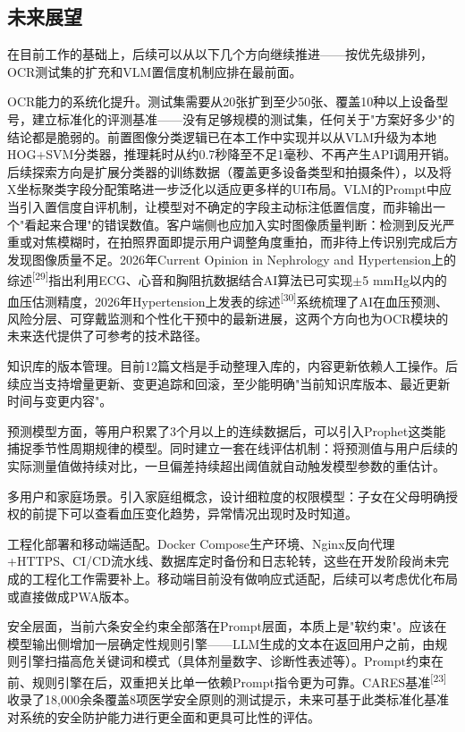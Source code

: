 \documentclass[zihao=-4,a4paper]{ctexart}
\numberwithin{figure}{section}
\numberwithin{table}{section}
\begin{document}
\subsection{未来展望}

在目前工作的基础上，后续可以从以下几个方向继续推进——按优先级排列，OCR测试集的扩充和VLM置信度机制应排在最前面。

OCR能力的系统化提升。测试集需要从20张扩到至少50张、覆盖10种以上设备型号，建立标准化的评测基准——没有足够规模的测试集，任何关于"方案好多少"的结论都是脆弱的。前置图像分类逻辑已在本工作中实现并以从VLM升级为本地HOG+SVM分类器，推理耗时从约0.7秒降至不足1毫秒、不再产生API调用开销。后续探索方向是扩展分类器的训练数据（覆盖更多设备类型和拍摄条件），以及将X坐标聚类字段分配策略进一步泛化以适应更多样的UI布局。VLM的Prompt中应当引入置信度自评机制，让模型对不确定的字段主动标注低置信度，而非输出一个"看起来合理"的错误数值。客户端侧也应加入实时图像质量判断：检测到反光严重或对焦模糊时，在拍照界面即提示用户调整角度重拍，而非待上传识别完成后方发现图像质量不足。2026年Current Opinion in Nephrology and Hypertension上的综述\textsuperscript{[29]}指出利用ECG、心音和胸阻抗数据结合AI算法已可实现$\pm$5 mmHg以内的血压估测精度，2026年Hypertension上发表的综述\textsuperscript{[30]}系统梳理了AI在血压预测、风险分层、可穿戴监测和个性化干预中的最新进展，这两个方向也为OCR模块的未来迭代提供了可参考的技术路径。

知识库的版本管理。目前12篇文档是手动整理入库的，内容更新依赖人工操作。后续应当支持增量更新、变更追踪和回滚，至少能明确"当前知识库版本、最近更新时间与变更内容"。

预测模型方面，等用户积累了3个月以上的连续数据后，可以引入Prophet这类能捕捉季节性周期规律的模型。同时建立一套在线评估机制：将预测值与用户后续的实际测量值做持续对比，一旦偏差持续超出阈值就自动触发模型参数的重估计。

多用户和家庭场景。引入家庭组概念，设计细粒度的权限模型：子女在父母明确授权的前提下可以查看血压变化趋势，异常情况出现时及时知道。

工程化部署和移动端适配。Docker Compose生产环境、Nginx反向代理+HTTPS、CI/CD流水线、数据库定时备份和日志轮转，这些在开发阶段尚未完成的工程化工作需要补上。移动端目前没有做响应式适配，后续可以考虑优化布局或直接做成PWA版本。

安全层面，当前六条安全约束全部落在Prompt层面，本质上是"软约束"。应该在模型输出侧增加一层确定性规则引擎——LLM生成的文本在返回用户之前，由规则引擎扫描高危关键词和模式（具体剂量数字、诊断性表述等）。Prompt约束在前、规则引擎在后，双重把关比单一依赖Prompt指令更为可靠。CARES基准\textsuperscript{[23]}收录了18,000余条覆盖8项医学安全原则的测试提示，未来可基于此类标准化基准对系统的安全防护能力进行更全面和更具可比性的评估。
\end{document}
